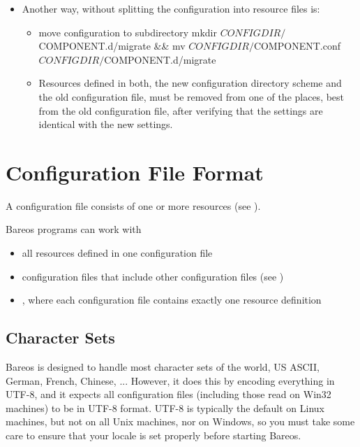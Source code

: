 \begin{itemize}
\begin{itemize}
\begin{commands}{\bareosMigrateConfigSh}
# install newly generated configuration
cp -a /tmp/bareos-dir.d /etc/bareos/
        \end{commands}
        Restart the \bareosDir and verify your configuration.
        Also make sure, that all resource configuration files coming from Bareos packages exists, in doubt as empty files, see \hyperlink{sec:deleteConfigurationResourceFiles}{remove configuration resource files}.

    \item Another way, without splitting the configuration into resource files is:
        \begin{itemize}
        \item \begin{commands}{move configuration to subdirectory}
mkdir $CONFIGDIR/$COMPONENT.d/migrate && mv $CONFIGDIR/$COMPONENT.conf $CONFIGDIR/$COMPONENT.d/migrate
        \end{commands}
        \item Resources defined in both, the new configuration directory scheme
                    and the old configuration file, must be removed from one of the places,
                    best from the old configuration file,
                    after verifying that the settings are identical with the new settings.
        \end{itemize}
    \end{itemize}
\end{itemize}

\section{Configuration File Format}

A configuration file consists of one or more resources (see ).

Bareos programs can work with
\begin{itemize}
  \item all resources defined in one configuration file
  \item configuration files that include other configuration files (see )
  \item {}, where each configuration file contains exactly one resource definition
\end{itemize}



\subsection{Character Sets}
Bareos is designed to handle most character sets of the world,
US ASCII, German, French, Chinese, ...  However, it does this by
encoding everything in UTF-8, and it expects all configuration files
(including those read on Win32 machines) to be in UTF-8 format.
UTF-8 is typically the default on Linux machines, but not on all
Unix machines, nor on Windows, so you must take some care to ensure
that your locale is set properly before starting Bareos.

